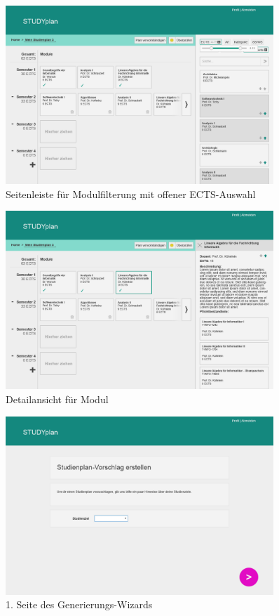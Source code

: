 \begin{figure}
	\caption{Seitenleiste für Modulfilterung mit offener ECTS-Auswahl}
	\label{fig:gui-module-filtern-2}
	\centering
	\includegraphics[width=0.9\textwidth]{../GUI/ergebnisse/module-filtern-2.png}
\end{figure}
\begin{figure}
	\caption{Detailansicht für Modul}
	\label{fig:gui-modul-info-1}
	\centering
	\includegraphics[width=0.9\textwidth]{../GUI/ergebnisse/modul-info-1.png}
\end{figure}
\begin{figure}
	\caption{1. Seite des Generierungs-Wizards}
	\label{fig:gui-generierung-1}
	\centering
	\includegraphics[width=0.9\textwidth]{../GUI/ergebnisse/generierung-1.png}
\end{figure}

